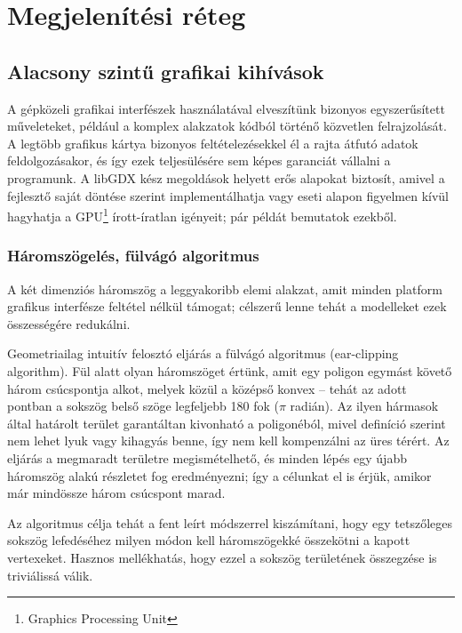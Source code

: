 \chapter{Megjelenítési réteg}

\section{Alacsony szintű grafikai kihívások}

A gépközeli grafikai interfészek használatával elveszítünk bizonyos egyszerűsített műveleteket, például a komplex alakzatok kódból történő közvetlen felrajzolását. A legtöbb grafikus kártya bizonyos feltételezésekkel él a rajta átfutó adatok feldolgozásakor, és így ezek teljesülésére sem képes garanciát vállalni a programunk. A libGDX kész megoldások helyett erős alapokat biztosít, amivel a fejlesztő saját döntése szerint implementálhatja vagy eseti alapon figyelmen kívül hagyhatja a GPU\footnote{Graphics Processing Unit} írott-íratlan igényeit; pár példát bemutatok ezekből.

\subsection{Háromszögelés, fülvágó algoritmus}

A két dimenziós háromszög a leggyakoribb elemi alakzat, amit minden platform grafikus interfésze feltétel nélkül támogat; célszerű lenne tehát a modelleket ezek összességére redukálni.

Geometriailag intuitív felosztó eljárás a fülvágó algoritmus (ear-clipping algorithm). Fül alatt olyan háromszöget értünk, amit egy poligon egymást követő három csúcspontja alkot, melyek közül a középső konvex -- tehát az adott pontban a sokszög belső szöge legfeljebb 180 fok ($\pi$ radián).\cite{TriangulationByEarClipping} Az ilyen hármasok által határolt terület garantáltan kivonható a poligonéból, mivel definíció szerint nem lehet lyuk vagy kihagyás benne, így nem kell kompenzálni az üres térért. Az eljárás a megmaradt területre megismételhető, és minden lépés egy újabb háromszög alakú részletet fog eredményezni; így a célunkat el is érjük, amikor már mindössze három csúcspont marad.

Az algoritmus célja tehát a fent leírt módszerrel kiszámítani, hogy egy tetszőleges sokszög lefedéséhez milyen módon kell háromszögekké összekötni a kapott vertexeket. Hasznos mellékhatás, hogy ezzel a sokszög területének összegzése is triviálissá válik.

